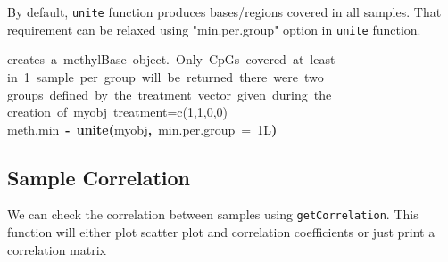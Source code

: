 \documentclass{article}
\makeatletter
\newcommand{\hlnumber}[1]{\textcolor[rgb]{0,0,0}{#1}}%
\newcommand{\hlfunctioncall}[1]{\textcolor[rgb]{.5,0,.33}{\textbf{#1}}}%
\newcommand{\hlkeyword}[1]{\textbf{#1}}%
\newcommand{\hlargument}[1]{\textcolor[rgb]{.69,.25,.02}{#1}}%
\newcommand{\hlcomment}[1]{\textcolor[rgb]{.18,.6,.34}{#1}}%
\newcommand{\hlassignement}[1]{\textbf{#1}}%
\newcommand{\hlsymbol}[1]{#1}%
\newcommand{\hlstd}[1]{\textcolor[rgb]{0,0,0}{#1}}%
\newenvironment{kframe}{%
 \def\FrameCommand##1{\hskip\@totalleftmargin \hskip-\fboxsep
 \colorbox{shadecolor}{##1}\hskip-\fboxsep
     \hskip-\linewidth \hskip-\@totalleftmargin \hskip\columnwidth}%
 \MakeFramed {\advance\hsize-\width
   \@totalleftmargin\z@ \linewidth\hsize
   \@setminipage}}%
 {\par\unskip\endMakeFramed}
\newenvironment{knitrout}{}{} %
\makeatother
\begin{document}
By default, \texttt{unite} function produces bases/regions covered in all samples. That requirement can be relaxed using "min.per.group" option in \texttt{unite} function.
\begin{knitrout}
\color{fgcolor}\begin{kframe}
\begin{flushleft}
\ttfamily\noindent
\hlcomment{\usebox{\hlnormalsizeboxhash}{\ }creates{\ }a{\ }methylBase{\ }object.{\ }Only{\ }CpGs{\ }covered{\ }at{\ }least}\hspace*{\fill}\\
\hlstd{}\hlcomment{\usebox{\hlnormalsizeboxhash}{\ }in{\ }1{\ }sample{\ }per{\ }group{\ }will{\ }be{\ }returned{\ }there{\ }were{\ }two}\hspace*{\fill}\\
\hlstd{}\hlcomment{\usebox{\hlnormalsizeboxhash}{\ }groups{\ }defined{\ }by{\ }the{\ }treatment{\ }vector{\ }given{\ }during{\ }the}\hspace*{\fill}\\
\hlstd{}\hlcomment{\usebox{\hlnormalsizeboxhash}{\ }creation{\ }of{\ }myobj{\ }treatment=c(1,1,0,0)}\hspace*{\fill}\\
\hlstd{}\hlsymbol{meth.min}{\ }\hlassignement{\usebox{\hlnormalsizeboxlessthan}-}{\ }\hlfunctioncall{unite}\hlkeyword{(}\hlsymbol{myobj}\hlkeyword{,}{\ }\hlargument{min.per.group}{\ }\hlargument{=}{\ }\hlnumber{1L}\hlkeyword{)}\mbox{}
\normalfont
\end{flushleft}
\end{kframe}
\end{knitrout}

\subsection{Sample Correlation}
We can check the correlation between samples using \texttt{getCorrelation}. This function will either plot scatter plot and correlation coefficients or just print a correlation matrix
\end{document}
